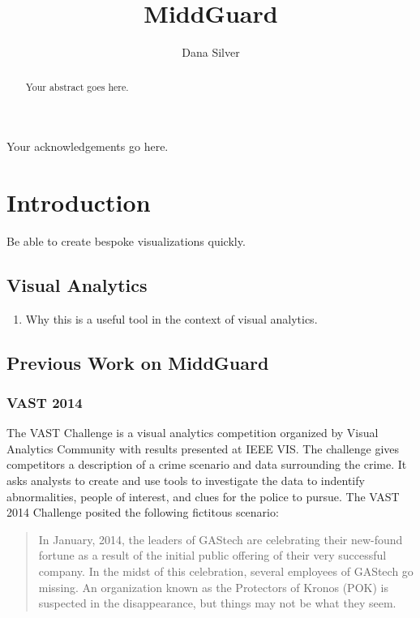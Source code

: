 \documentclass[midd]{thesis}
\title {MiddGuard}
\author {Dana Silver}
\begin{document}
\maketitle

\begin{abstract}
Your abstract goes here.
\end{abstract}

\begin{acknowledgements}
Your acknowledgements go here.
\end{acknowledgements}

\contentspage
\tablelistpage
\figurelistpage

\normalspacing \setcounter{page}{1} 

\chapter{Introduction}

Be able to create bespoke visualizations quickly.

\section{Visual Analytics}
\begin{enumerate}
  \item Why this is a useful tool in the context of visual analytics.
\end{enumerate}

\section{Previous Work on MiddGuard}
\subsection{VAST 2014}

The VAST Challenge is a visual analytics competition organized by Visual
Analytics Community with results presented at IEEE VIS. The challenge gives
competitors a description of a crime scenario and data surrounding the crime. It
asks analysts to create and use tools to investigate the data to indentify
abnormalities, people of interest, and clues for the police to pursue. The VAST
2014 Challenge \cite{vast2014} posited the following fictitous scenario:

\begin{quote}
In January, 2014, the leaders of GAStech are celebrating their new-found fortune
as a result of the initial public offering of their very successful company. In
the midst of this celebration, several employees of GAStech go missing. An
organization known as the Protectors of Kronos (POK) is suspected in the
disappearance, but things may not be what they seem.
\end{quote}
\end{document}
